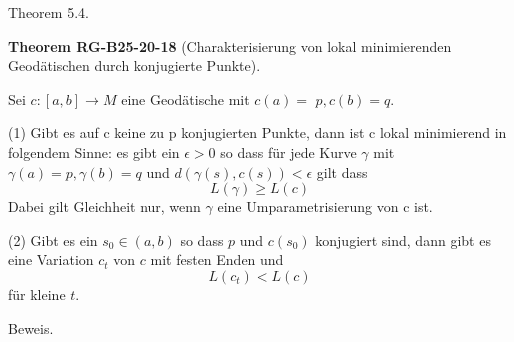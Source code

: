 \documentclass[10pt, letterpaper]{article}
\newcommand{\CustomHeading}[3]{%
  \par\medskip\noindent%
  \textbf{#1 #2} \textnormal{(#3)}.\enskip%
}
\newenvironment{THEO}[2]{\begin{unitbox}\CustomHeading{Theorem}{#1}{#2}}{\end{unitbox}}
\begin{document}
Theorem 5.4. 


\begin{THEO}{RG-B25-20-18}{Charakterisierung von lokal minimierenden Geodätischen durch konjugierte Punkte}
Sei $c:[a, b] \rightarrow M$ eine Geodätische mit $c(a)=$ $p, c(b)=q$.

(1) Gibt es auf c keine zu p konjugierten Punkte, dann ist c lokal minimierend in folgendem Sinne: es gibt ein $\epsilon>0$ so dass für jede Kurve $\gamma$ mit $\gamma(a)=p, \gamma(b)=q$ und $d(\gamma(s), c(s))<\epsilon$ gilt dass
$$
L(\gamma) \geq L(c)
$$
Dabei gilt Gleichheit nur, wenn $\gamma$ eine Umparametrisierung von c ist.

(2) Gibt es ein $s_{0} \in(a, b)$ so dass $p$ und $c\left(s_{0}\right)$ konjugiert sind, dann gibt es eine Variation $c_{t}$ von $c$ mit festen Enden und
$$
L\left(c_{t}\right)<L(c)
$$
für kleine $t$.
\end{THEO}


Beweis. 
\end{document}
